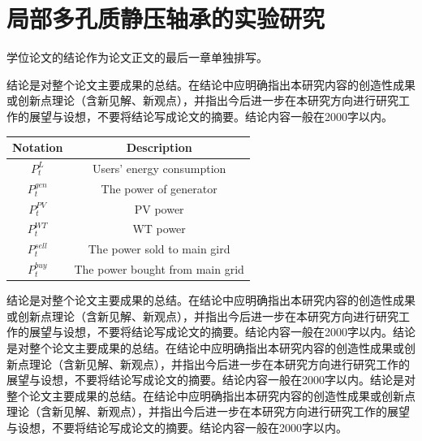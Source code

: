 \chapter{局部多孔质静压轴承的实验研究}

学位论文的结论作为论文正文的最后一章单独排写。

结论是对整个论文主要成果的总结。在结论中应明确指出本研究内容的创造性成果或创新点理论（含新见解、新观点），并指出今后进一步在本研究方向进行研究工作的展望与设想，不要将结论写成论文的摘要。结论内容一般在2000字以内。

\begin{table}[htbp]
\label{notation} %

\begin{tabularx}{\textwidth}{ C{0.4} C{0.6}}
    \toprule[1.5pt]
        Notation & Description   \\  
    \midrule[1pt]
        $P_{t}^L$ & Users' energy consumption \\ 
        $P_t^{gen}$ & The power of generator\\
        $P_t^{PV}$ & PV power \\ 
        $P_t^{WT}$ & WT power  \\
        $P_t^{sell}$ & The power sold to main gird \\ 
        $P_t^{buy}$ & The power bought from main grid\\
    \bottomrule[1.5pt]
\end{tabularx}
\end{table}

结论是对整个论文主要成果的总结。在结论中应明确指出本研究内容的创造性成果或创新点理论（含新见解、新观点），并指出今后进一步在本研究方向进行研究工作的展望与设想，不要将结论写成论文的摘要。结论内容一般在2000字以内。结论是对整个论文主要成果的总结。在结论中应明确指出本研究内容的创造性成果或创新点理论（含新见解、新观点），并指出今后进一步在本研究方向进行研究工作的展望与设想，不要将结论写成论文的摘要。结论内容一般在2000字以内。结论是对整个论文主要成果的总结。在结论中应明确指出本研究内容的创造性成果或创新点理论（含新见解、新观点），并指出今后进一步在本研究方向进行研究工作的展望与设想，不要将结论写成论文的摘要。结论内容一般在2000字以内。


